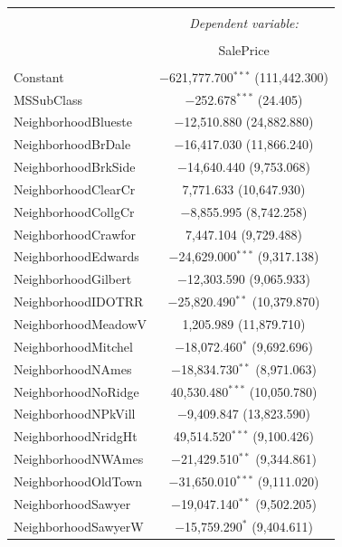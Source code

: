 \documentclass[]{article}
\begin{document}
\begin{table}[!htbp] \centering 
  \caption{} 
  \label{} 
\normalsize 
\begin{tabular}{@{\extracolsep{5pt}}lc} 
\\[-1.8ex]\hline 
\hline \\[-1.8ex] 
 & \multicolumn{1}{c}{\textit{Dependent variable:}} \\ 
\cline{2-2} 
\\[-1.8ex] & SalePrice \\ 
\hline \\[-1.8ex] 
 Constant & $-$621,777.700$^{***}$ (111,442.300) \\ 
  MSSubClass & $-$252.678$^{***}$ (24.405) \\ 
  NeighborhoodBlueste & $-$12,510.880 (24,882.880) \\ 
  NeighborhoodBrDale & $-$16,417.030 (11,866.240) \\ 
  NeighborhoodBrkSide & $-$14,640.440 (9,753.068) \\ 
  NeighborhoodClearCr & 7,771.633 (10,647.930) \\ 
  NeighborhoodCollgCr & $-$8,855.995 (8,742.258) \\ 
  NeighborhoodCrawfor & 7,447.104 (9,729.488) \\ 
  NeighborhoodEdwards & $-$24,629.000$^{***}$ (9,317.138) \\ 
  NeighborhoodGilbert & $-$12,303.590 (9,065.933) \\ 
  NeighborhoodIDOTRR & $-$25,820.490$^{**}$ (10,379.870) \\ 
  NeighborhoodMeadowV & 1,205.989 (11,879.710) \\ 
  NeighborhoodMitchel & $-$18,072.460$^{*}$ (9,692.696) \\ 
  NeighborhoodNAmes & $-$18,834.730$^{**}$ (8,971.063) \\ 
  NeighborhoodNoRidge & 40,530.480$^{***}$ (10,050.780) \\ 
  NeighborhoodNPkVill & $-$9,409.847 (13,823.590) \\ 
  NeighborhoodNridgHt & 49,514.520$^{***}$ (9,100.426) \\ 
  NeighborhoodNWAmes & $-$21,429.510$^{**}$ (9,344.861) \\ 
  NeighborhoodOldTown & $-$31,650.010$^{***}$ (9,111.020) \\ 
  NeighborhoodSawyer & $-$19,047.140$^{**}$ (9,502.205) \\ 
  NeighborhoodSawyerW & $-$15,759.290$^{*}$ (9,404.611) \\ 

\end{tabular}
\end{table}
\end{document}
